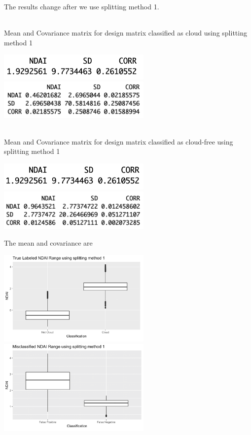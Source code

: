\documentclass[11pt]{article}
\begin{document}
The results change after we use splitting method 1.

\mbox{}\\
Mean and Covariance matrix for design matrix classified as cloud using splitting method 1

\includegraphics[width = 7.5cm]{4(d)1}
\includegraphics[width = 7.5cm]{4(d)2}

\mbox{}\\
Mean and Covariance matrix for design matrix classified as cloud-free using splitting method 1

\includegraphics[width = 7.5cm]{4(d)3}
\includegraphics[width = 7.5cm]{4(d)4}

The mean and covariance are 

\includegraphics[width = 7.5cm]{4(d)ndai1}
\includegraphics[width = 7.5cm]{4(d)ndai2}
\end{document}
